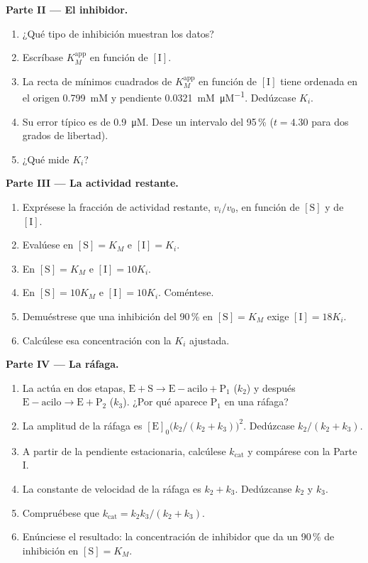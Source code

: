\begin{problem}
\medskip\noindent\textbf{Parte II --- El inhibidor.}
\begin{enumerate}[resume]
  \item ¿Qué tipo de inhibición muestran los datos?
  \item Escríbase $K_M^{\mathrm{app}}$ en función de $[\mathrm I]$.
  \item La recta de mínimos cuadrados de $K_M^{\mathrm{app}}$ en función de $[\mathrm I]$ tiene ordenada en el origen \qty{0.799}{mM} y
        pendiente \qty{0.0321}{mM.\micro M^{-1}}. Dedúzcase $K_i$.
  \item Su error típico es de \qty{0.9}{\micro M}. Dese un intervalo del 95\,\% ($t = 4.30$ para
        dos grados de libertad).
  \item ¿Qué mide $K_i$?
\end{enumerate}

\medskip\noindent\textbf{Parte III --- La actividad restante.}
\begin{enumerate}[resume]
  \item Exprésese la fracción de actividad restante, $v_i/v_0$, en función de $[\mathrm S]$ y de
        $[\mathrm I]$.
  \item Evalúese en $[\mathrm S] = K_M$ e $[\mathrm I] = K_i$.
  \item En $[\mathrm S] = K_M$ e $[\mathrm I] = 10K_i$.
  \item En $[\mathrm S] = 10K_M$ e $[\mathrm I] = 10K_i$. Coméntese.
  \item Demuéstrese que una inhibición del 90\,\% en $[\mathrm S] = K_M$ exige $[\mathrm I] = 18K_i$.
  \item Calcúlese esa concentración con la $K_i$ ajustada.
\end{enumerate}

\medskip\noindent\textbf{Parte IV --- La ráfaga.}
\begin{enumerate}[resume]
  \item La  actúa en dos etapas, $\mathrm{E + S \to E{-}acilo + P_1}$ ($k_2$) y después $\mathrm{E{-}acilo \to E +
        P_2}$ ($k_3$). ¿Por qué aparece $\mathrm P_1$ en una ráfaga?
  \item La amplitud de la ráfaga es $[\mathrm E]_0\bigl(k_2/(k_2 + k_3)\bigr)^2$. Dedúzcase $k_2/(k_2 + k_3)$.
  \item A partir de la pendiente estacionaria, calcúlese $k_{\mathrm{cat}}$ y compárese con la Parte I.
  \item La constante de velocidad de la ráfaga es $k_2 + k_3$. Dedúzcanse $k_2$ y $k_3$.
  \item Compruébese que $k_{\mathrm{cat}} = k_2k_3/(k_2 + k_3)$.
  \item Enúnciese el resultado: la concentración de inhibidor que da un 90\,\% de inhibición en
        $[\mathrm S] = K_M$.
\end{enumerate}
\end{problem}
